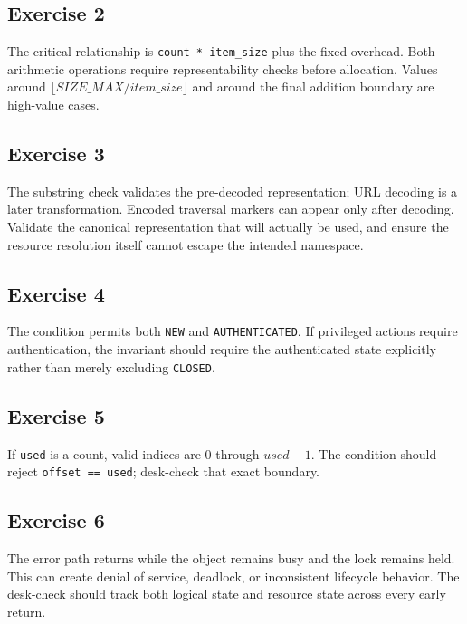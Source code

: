 \documentclass[10pt]{article}
\begin{document}
\subsection*{Exercise 2}
The critical relationship is \texttt{count * item\_size} plus the fixed overhead. Both arithmetic operations require representability checks before allocation. Values around \(\lfloor SIZE\_MAX/item\_size\rfloor\) and around the final addition boundary are high-value cases.

\subsection*{Exercise 3}
The substring check validates the pre-decoded representation; URL decoding is a later transformation. Encoded traversal markers can appear only after decoding. Validate the canonical representation that will actually be used, and ensure the resource resolution itself cannot escape the intended namespace.

\subsection*{Exercise 4}
The condition permits both \texttt{NEW} and \texttt{AUTHENTICATED}. If privileged actions require authentication, the invariant should require the authenticated state explicitly rather than merely excluding \texttt{CLOSED}.

\subsection*{Exercise 5}
If \texttt{used} is a count, valid indices are \(0\) through \(used-1\). The condition should reject \texttt{offset == used}; desk-check that exact boundary.

\subsection*{Exercise 6}
The error path returns while the object remains busy and the lock remains held. This can create denial of service, deadlock, or inconsistent lifecycle behavior. The desk-check should track both logical state and resource state across every early return.
\clearpage
\end{document}
